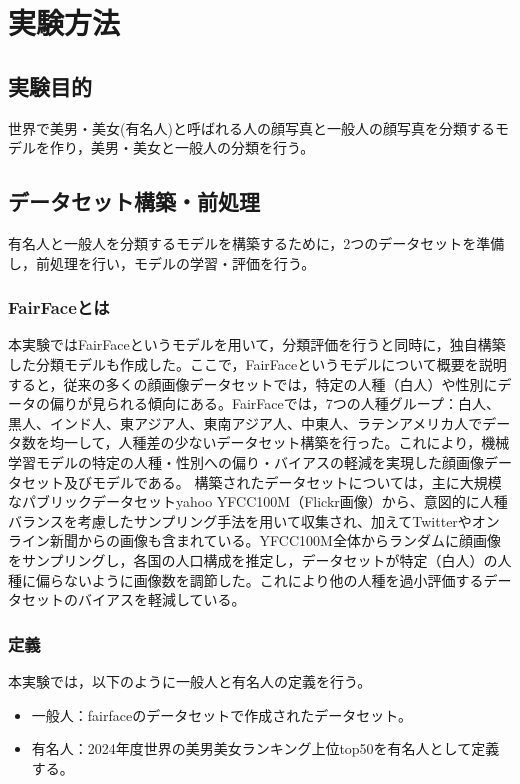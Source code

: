 \documentclass[a4paper,11pt,titlepage]{jsarticle}
\begin{document}
\section{実験方法}
\subsection{実験目的}
世界で美男・美女(有名人)と呼ばれる人の顔写真と一般人の顔写真を分類するモデルを作り，美男・美女と一般人の分類を行う。

\subsection{データセット構築・前処理}
有名人と一般人を分類するモデルを構築するために，2つのデータセットを準備し，前処理を行い，モデルの学習・評価を行う。

\subsubsection{FairFaceとは}
本実験ではFairFaceというモデルを用いて，分類評価を行うと同時に，独自構築した分類モデルも作成した。ここで，FairFaceというモデルについて概要を説明すると，従来の多くの顔画像データセットでは，特定の人種（白人）や性別にデータの偏りが見られる傾向にある。FairFaceでは，7つの人種グループ：白人、黒人、インド人、東アジア人、東南アジア人、中東人、ラテンアメリカ人でデータ数を均一して，人種差の少ないデータセット構築を行った。これにより，機械学習モデルの特定の人種・性別への偏り・バイアスの軽減を実現した顔画像データセット及びモデルである。
構築されたデータセットについては，主に大規模なパブリックデータセットyahoo YFCC100M（Flickr画像）から、意図的に人種バランスを考慮したサンプリング手法を用いて収集され、加えてTwitterやオンライン新聞からの画像も含まれている。YFCC100M全体からランダムに顔画像をサンプリングし，各国の人口構成を推定し，データセットが特定（白人）の人種に偏らないように画像数を調節した。これにより他の人種を過小評価するデータセットのバイアスを軽減している。

\subsubsection{定義}
本実験では，以下のように一般人と有名人の定義を行う。
\begin{itemize}
    \item 一般人：fairfaceのデータセットで作成されたデータセット。
    \item 有名人：2024年度世界の美男美女ランキング上位top50を有名人として定義する。
\end{itemize}
\end{document}
